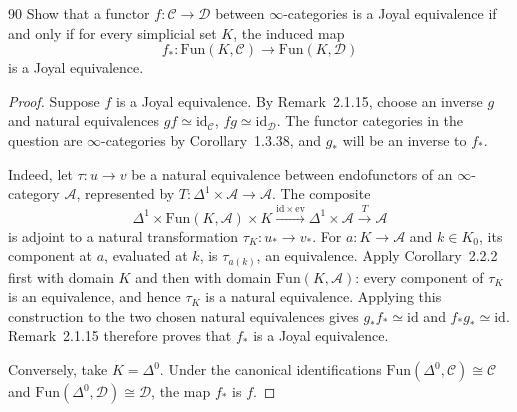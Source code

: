 \begin{exercise}{90}
Show that a functor $f\colon\mathcal C\to\mathcal D$ between $\infty$-categories
is a Joyal equivalence if and only if for every simplicial set $K$, the induced map
\[
 f_*\colon\mathrm{Fun}(K,\mathcal C)\to\mathrm{Fun}(K,\mathcal D)
\]
is a Joyal equivalence.

\begin{proof}
Suppose $f$ is a Joyal equivalence. By Remark~2.1.15, choose an inverse
$g$ and natural equivalences $gf\simeq\mathrm{id}_{\mathcal C}$,
$fg\simeq\mathrm{id}_{\mathcal D}$.
The functor categories in the question are $\infty$-categories by
Corollary~1.3.38, and $g_*$ will be an inverse to $f_*$.

Indeed, let $\tau\colon u\to v$ be a natural equivalence between
endofunctors of an $\infty$-category $\mathcal A$, represented by
$T\colon\Delta^1\times\mathcal A\to\mathcal A$.
The composite
\[
 \Delta^1\times\mathrm{Fun}(K,\mathcal A)\times K
 \xrightarrow{\mathrm{id}\times\mathrm{ev}}
 \Delta^1\times\mathcal A\xrightarrow{T}\mathcal A
\]
is adjoint to a natural transformation $\tau_K\colon u_*\to v_*$.
For $a\colon K\to\mathcal A$ and $k\in K_0$, its component at $a$,
evaluated at $k$, is $\tau_{a(k)}$, an equivalence.
Apply Corollary~2.2.2 first with domain $K$ and then with domain
$\mathrm{Fun}(K,\mathcal A)$: every component of $\tau_K$ is an
equivalence, and hence $\tau_K$ is a natural equivalence.
Applying this construction to the two chosen natural equivalences gives
$g_*f_*\simeq\mathrm{id}$ and $f_*g_*\simeq\mathrm{id}$.
Remark~2.1.15 therefore proves that $f_*$ is a Joyal equivalence.

Conversely, take $K=\Delta^0$. Under the canonical identifications
$\mathrm{Fun}(\Delta^0,\mathcal C)\cong\mathcal C$ and
$\mathrm{Fun}(\Delta^0,\mathcal D)\cong\mathcal D$, the map $f_*$ is $f$.
\end{proof}
\end{exercise}
